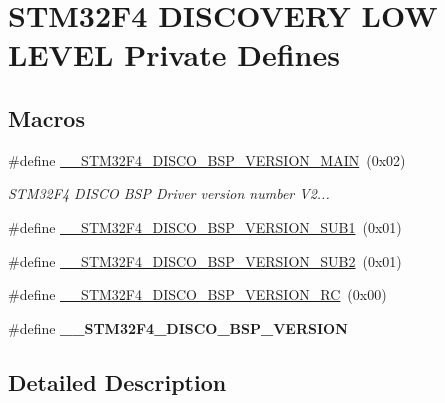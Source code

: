 \hypertarget{group___s_t_m32_f4___d_i_s_c_o_v_e_r_y___l_o_w___l_e_v_e_l___private___defines}{}\section{S\+T\+M32\+F4 D\+I\+S\+C\+O\+V\+E\+RY L\+OW L\+E\+V\+EL Private Defines}
\label{group___s_t_m32_f4___d_i_s_c_o_v_e_r_y___l_o_w___l_e_v_e_l___private___defines}
\subsection*{Macros}
\begin{DoxyCompactItemize}
\item 
\#define \mbox{\hyperlink{group___s_t_m32_f4___d_i_s_c_o_v_e_r_y___l_o_w___l_e_v_e_l___private___defines_ga9b9ce78017b00a5149e65e663676bf1a}{\+\_\+\+\_\+\+S\+T\+M32\+F4\+\_\+\+D\+I\+S\+C\+O\+\_\+\+B\+S\+P\+\_\+\+V\+E\+R\+S\+I\+O\+N\+\_\+\+M\+A\+IN}}~(0x02)
\begin{DoxyCompactList}\small\item\em S\+T\+M32\+F4 D\+I\+S\+CO B\+SP Driver version number V2... \end{DoxyCompactList}\item 
\#define \mbox{\hyperlink{group___s_t_m32_f4___d_i_s_c_o_v_e_r_y___l_o_w___l_e_v_e_l___private___defines_ga53a734726d1b7247bb620a56de8d154e}{\+\_\+\+\_\+\+S\+T\+M32\+F4\+\_\+\+D\+I\+S\+C\+O\+\_\+\+B\+S\+P\+\_\+\+V\+E\+R\+S\+I\+O\+N\+\_\+\+S\+U\+B1}}~(0x01)
\item 
\#define \mbox{\hyperlink{group___s_t_m32_f4___d_i_s_c_o_v_e_r_y___l_o_w___l_e_v_e_l___private___defines_ga56f24ebf9cca2d997596f4eb6aba19fc}{\+\_\+\+\_\+\+S\+T\+M32\+F4\+\_\+\+D\+I\+S\+C\+O\+\_\+\+B\+S\+P\+\_\+\+V\+E\+R\+S\+I\+O\+N\+\_\+\+S\+U\+B2}}~(0x01)
\item 
\#define \mbox{\hyperlink{group___s_t_m32_f4___d_i_s_c_o_v_e_r_y___l_o_w___l_e_v_e_l___private___defines_ga49aad18854e17cbfa696c09b9c02913c}{\+\_\+\+\_\+\+S\+T\+M32\+F4\+\_\+\+D\+I\+S\+C\+O\+\_\+\+B\+S\+P\+\_\+\+V\+E\+R\+S\+I\+O\+N\+\_\+\+RC}}~(0x00)
\item 
\#define {\bfseries \+\_\+\+\_\+\+S\+T\+M32\+F4\+\_\+\+D\+I\+S\+C\+O\+\_\+\+B\+S\+P\+\_\+\+V\+E\+R\+S\+I\+ON}
\end{DoxyCompactItemize}


\subsection{Detailed Description}


